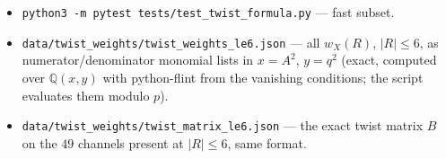 \documentclass[11pt]{article}
\newcommand{\LMPH}[1]{\texttt{#1}}
\begin{document}
\begin{itemize}
\eqref{eq:Ndet}, \eqref{eq:Phidet}, \LMPH{colour\_product}, \LMPH{colour\_sum} and \LMPH{pair\_product}
\eqref{eq:colprod} (Observation~\ref{obs:bc}), \LMPH{law\_gap}, \LMPH{law\_annihilators}, \LMPH{solve\_mod} and
\LMPH{regular\_completion} (the regularity law and the solver of Conjecture~\ref{conj:final}), and \LMPH{closed\_N} / \LMPH{closed\_H}, which build $N$ from the closed rules and
evaluate \eqref{eq:U}.  \LMPH{--nmax 10 closed} is the end-to-end check (about two minutes).
\item \LMPH{python3 -m pytest tests/test\_twist\_formula.py} --- fast subset.
\item \LMPH{data/twist\_weights/twist\_weights\_le6.json} --- all $w_X(R)$, $|R|\le6$, as numerator/denominator
monomial lists in $x=A^2$, $y=q^2$ (exact, computed over $\mathbb Q(x,y)$ with python-flint from the vanishing
conditions; the script evaluates them modulo $p$).
\item \LMPH{data/twist\_weights/twist\_matrix\_le6.json} --- the exact twist matrix $B$ on the $49$ channels present
at $|R|\le6$, same format.
\end{itemize}
\end{document}

